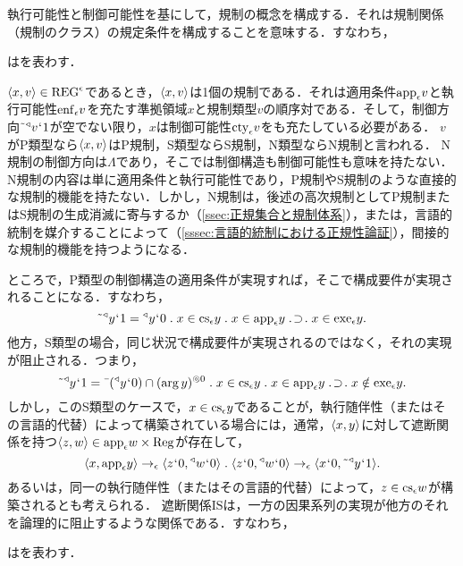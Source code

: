 執行可能性と制御可能性を基にして，規制の概念を構成する．それは規制関係（規制のクラス）の規定条件を構成することを意味する．すなわち，
\begin{df}
\label{df:規制関係}
はを表わす．
\end{df}

\noindent $ \langle x,v \rangle\in\mathrm{REG}^\epsilon $であるとき，$\langle x,v \rangle$は1個の規制である．それは適用条件$\mathrm{app}_{\epsilon} v$と執行可能性$ \mathrm{enf}_{\epsilon}v $を充たす準拠領域$x$と規制類型$v$の順序対である．そして，制御方向$ \tilde{\:\:}{^\triangleleft}v{\mspace{1mu}{`}\mspace{1mu}} 1 $が空でない限り，$ x $は制御可能性$ \mathrm{cty}_{\epsilon}v $をも充たしている必要がある．
$v$がP類型なら$\langle x,v \rangle$はP規制，S類型ならS規制，N類型ならN規制と言われる．
N規制の制御方向は$ \Lambda $であり，そこでは制御構造も制御可能性も意味を持たない．N規制の内容は単に適用条件と執行可能性であり，P規制やS規制のような直接的な規制的機能を持たない．しかし，N規制は，後述の高次規制としてP規制またはS規制の生成消滅に寄与するか（\ref{ssec:正規集合と規制体系}），または，言語的統制を媒介することによって（\ref{sssec:言語的統制における正規性論証}），間接的な規制的機能を持つようになる．

ところで，P類型の制御構造の適用条件が実現すれば，そこで構成要件が実現されることになる．すなわち，
\[
    \tildel{\trgl{y}}\fap 1 = \trgl{y}\fap 0\con{1}x\in \cs{\epsilon}y\con{1}x\in\app{\epsilon} y \case{1}{1}{1}x\in\exe{\epsilon} y.
\]
他方，S類型の場合，同じ状況で構成要件が実現されるのではなく，それの実現が阻止される．つまり，
\[
    \tildel{\trgl{y}}\fap 1 = \barl{(\trgl{y}\fap 0)}\cap\msec{(\arg y)}{0}\con{1}x\in \cs{\epsilon}y\con{1}x\in\app{\epsilon} y \case{1}{1}{1}x\notin\exe{\epsilon} y.
\]
しかし，このS類型のケースで，$ x\in \mathrm{cs}_{\epsilon}y $であることが，執行随伴性（またはその言語的代替）によって構築されている場合には，通常，$\langle x,y \rangle$に対して遮断関係を持つ$ \langle z,w \rangle\in \mathrm{app}_{\epsilon} w\times\mathrm{Reg} $が存在して，
\[
    \orp{x,\app{\epsilon} y}\to_{\epsilon}\orp{z\fap 0,\trgl{w}\fap 0}\con{1}
    \orp{z\fap 0,\trgl{w}\fap 0}\to_{\epsilon}\orp{x\fap 0,\tildel{\trgl{y}}\fap 1}.
\]
あるいは，同一の執行随伴性（またはその言語的代替）によって，$ z\in\mathrm{cs}_{\epsilon}w $が構築されるとも考えられる．
遮断関係$\mathrm{IS}$は，一方の因果系列の実現が他方のそれを論理的に阻止するような関係である．すなわち，

\begin{df}
\label{df:遮断関係}
はを表わす．
\end{df}

